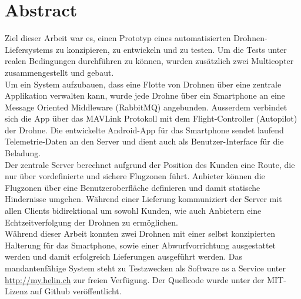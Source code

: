 \newpage
{}
\chapter*{Abstract}

Ziel dieser Arbeit war es, einen Prototyp eines automatisierten Drohnen-Liefersystems zu konzipieren, zu entwickeln und zu testen. Um die Tests unter realen Bedingungen durchführen zu können, wurden zusätzlich zwei Multicopter zusammengestellt und gebaut.\\

Um ein System aufzubauen, dass eine Flotte von Drohnen über eine zentrale Applikation verwalten kann, wurde jede Drohne über ein Smartphone an eine Message Oriented Middleware (RabbitMQ) angebunden. Ausserdem verbindet sich die App über das \Gls{MAVLink} Protokoll mit dem \Gls{Flight-Controller} (Autopilot) der Drohne. 
Die entwickelte Android-App für das Smartphone sendet laufend Telemetrie-Daten an den Server und dient auch als Benutzer-Interface für die Beladung. \\

Der zentrale Server berechnet aufgrund der Position des Kunden eine Route, die nur über vordefinierte und sichere Flugzonen führt. Anbieter können die Flugzonen über eine Benutzeroberfläche definieren und damit statische Hindernisse umgehen. Während einer Lieferung kommuniziert der Server mit allen Clients bidirektional um sowohl Kunden, wie auch Anbietern eine Echtzeitverfolgung der Drohnen zu ermöglichen. \\

Während dieser Arbeit konnten zwei Drohnen mit einer selbst konzipierten Halterung für das Smartphone, sowie einer Abwurfvorrichtung ausgestattet werden und damit erfolgreich Lieferungen ausgeführt werden. Das mandantenfähige System steht zu Testzwecken als Software as a Service unter \url{http://my.helin.ch} zur freien Verfügung. Der Quellcode wurde unter der MIT-Lizenz auf Github veröffentlicht.

